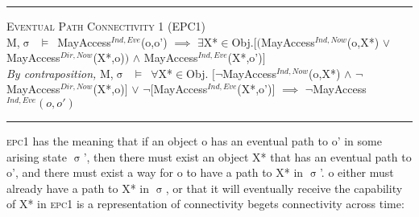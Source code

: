 \documentclass[a4paper,11pt, twoside,twocolumn]{article}
\newenvironment{logic}[1][null]
{\begin{flushleft} \small \label{#1}}
{\end{flushleft}}
\newcommand{\loin}{$\in$}
\newcommand{\loforall}{$\forall$}
\newcommand{\loexists}{$\exists$}
\newcommand{\loand}{$\land$}
\newcommand{\loor} {$\lor$}
\newcommand{\loimplies}{$\implies$}
\newcommand{\losigma}{$\upsigma$}
\newcommand{\loturns} {$\vDash$}
\newcommand{\loneg}{$\boldsymbol \neg$}
\newcommand{\ablock} {\null\qquad}
\begin{document}
\begin{logic}
\hrule\null
\textsc{\normalsize *Eventual Path Connectivity 1 (EPC1)}\\
M,\losigma\ \loturns\ MayAccess$^{Ind,Eve}$(o,o')\linebreak
\ablock \loimplies\linebreak
\ablock \loexists X*\loin Obj.$[($MayAccess$^{Ind,Now}$(o,X*) \loor \linebreak
\ablock \ablock \ablock \ablock MayAccess$^{Dir,Now}$(X*,o)$)$\linebreak
\ablock \ablock \ablock \ablock \loand \linebreak
\ablock \ablock \ablock \ablock MayAccess$^{Ind,Eve}$(X*,o')$]$
\linebreak \\
\textit{By contraposition,}\linebreak
M,\losigma\ \loturns\ 
\loforall X*\loin Obj. $[$\loneg MayAccess$^{Ind,Now}$(o,X*) \loand \linebreak
\ablock \ablock \ablock \ablock \loneg MayAccess$^{Dir,Now}$(X*,o)$]$\linebreak
\ablock \ablock \ablock \ablock \loor \linebreak
\ablock \ablock \ablock \ablock \loneg $[$MayAccess$^{Ind,Eve}$(X*,o')$]$\linebreak
\ablock \loimplies\linebreak
	\ablock\loneg MayAccess$^{Ind,Eve}(o,o')$\linebreak
\hrule
\end{logic}
\textsc{epc1} has the meaning that if an object o has an eventual path to o' in some arising state \losigma', then there must exist an object X* that has an eventual path to o', and there must exist a way for o to have a path to X* in \losigma'. o either must already have a path to X* in \losigma, or that it will eventually receive the capability of X* in \textsc{epc1} is a representation of connectivity begets connectivity across time:
\end{document}
